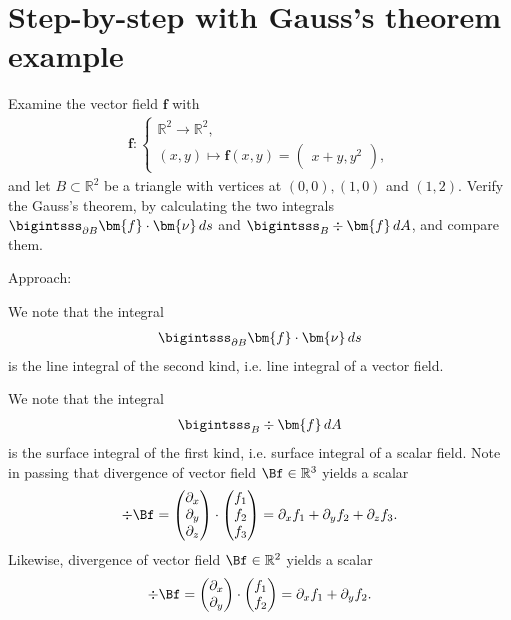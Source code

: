 \documentclass[12pt]{article}
\begin{document}
\section{Step-by-step with Gauss's theorem example}
\begin{exampleboxed}
	Examine the vector field $\bm{f}$ with
	\begin{align}
		\bm{f}:
		\begin{cases}
			\mathbb{R}^2 \rightarrow \mathbb{R}^2, \\
			(x,y) \mapsto \bm{f}(x,y)
			= \begin{pmatrix} x+y, y^2\end{pmatrix},
		\end{cases}
	\end{align}
	and let $B\subset \mathbb{R}^2$ be a triangle with vertices at $(0,0),(1,0)$ and $(1,2).$
	Verify the Gauss's theorem, by calculating the two integrals
	$\bigintsss_{\partial B} \bm{f}\cdot \bm{\nu} \, ds$ and
	$\bigintsss_B \div \bm{f} \, dA$, and compare them.
\end{exampleboxed}
Approach: 
\begin{observationboxed}
	We note that the integral
	\begin{align}
		\bigintsss_{\partial B} \bm{f}\cdot \bm{\nu} \, ds
	\end{align}
	is the line integral of the second kind, i.e.
	line integral of a vector field.
\end{observationboxed}
\begin{observationboxed}
	We note that the integral
	\begin{align}
		\bigintsss_B \div \bm{f} \, dA
	\end{align}
	is the surface integral of the first kind, i.e.
	surface integral of a scalar field. 
	Note in passing that divergence of vector field $ \Bf \in \mathbb{R}^3$ yields a scalar 
	\begin{align}
		\div \Bf = 
		\begin{pmatrix} \partial_x \\ \partial_y \\ \partial_z \end{pmatrix}
		\cdot 
		\begin{pmatrix} f_1 \\ f_2 \\ f_3 \end{pmatrix}
		=
		\partial_x f_1 + \partial_yf_2 + \partial_zf_3.
	\end{align}
	Likewise, divergence of vector field $ \Bf \in \mathbb{R}^2$ yields a scalar
	\begin{align}
		\div \Bf = 
		\begin{pmatrix} \partial_x \\ \partial_y \end{pmatrix}
		\cdot 
		\begin{pmatrix} f_1 \\ f_2 \end{pmatrix}
		=
		\partial_x f_1 + \partial_yf_2.
	\end{align}
\end{observationboxed}
\end{document}
